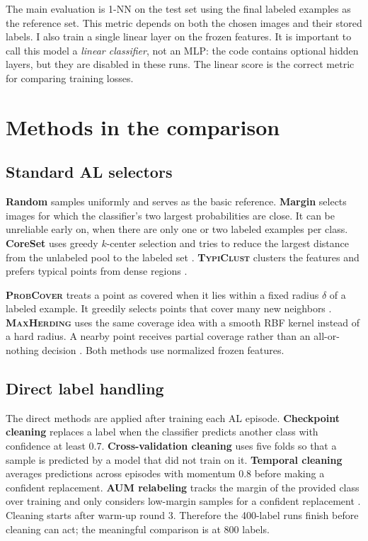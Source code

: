 \documentclass[10pt,twocolumn]{article}
\newcommand{\pc}{\textnormal{\textsc{ProbCover}}}
\newcommand{\mh}{\textnormal{\textsc{MaxHerding}}}
\newcommand{\tc}{\textnormal{\textsc{TypiClust}}}
\begin{document}
The main evaluation is 1-NN on the test set using the final labeled examples as
the reference set. This metric depends on both the chosen images and their
stored labels. I also train a single linear layer on the frozen features. It is
important to call this model a \emph{linear classifier}, not an MLP: the code
contains optional hidden layers, but they are disabled in these runs. The
linear score is the correct metric for comparing training losses.

\section{Methods in the comparison}

\subsection{Standard AL selectors}

\textbf{Random} samples uniformly and serves as the basic reference. \textbf{Margin}
selects images for which the classifier's two largest probabilities are close.
It can be unreliable early on, when there are only one or two labeled
examples per class. \textbf{CoreSet} uses greedy $k$-center selection and tries
to reduce the largest distance from the unlabeled pool to the labeled set
\cite{sener2018coreset}. \textbf{\tc{}} clusters the features and prefers
typical points from dense regions \cite{hacohen2022typiclust}.

\textbf{\pc{}} treats a point as covered when it lies within a fixed radius
$\delta$ of a labeled example. It greedily selects points that cover many new
neighbors \cite{yehuda2022probcover}. \textbf{\mh{}} uses the same coverage
idea with a smooth RBF kernel instead of a hard radius. A nearby point receives
partial coverage rather than an all-or-nothing decision
\cite{bae2024maxherding}. Both methods use normalized frozen features.

\subsection{Direct label handling}

The direct methods are applied after training each AL episode. \textbf{Checkpoint
cleaning} replaces a label when the classifier predicts another class with
confidence at least 0.7. \textbf{Cross-validation cleaning} uses five folds so
that a sample is predicted by a model that did not train on it. \textbf{Temporal
cleaning} averages predictions across episodes with momentum 0.8 before making
a confident replacement. \textbf{AUM relabeling} tracks the margin of the
provided class over training and only considers low-margin samples for a
confident replacement \cite{pleiss2020aum}. Cleaning starts after warm-up round
3. Therefore the 400-label runs finish before cleaning can act; the meaningful
comparison is at 800 labels.
\end{document}
